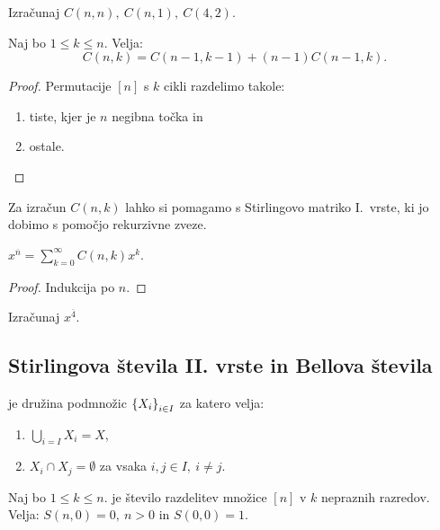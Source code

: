 \begin{primer}
    Izračunaj $C(n,n), \ C(n, 1), \ C(4,2)$.
\end{primer}

\begin{trditev}
    Naj bo $1 \leq k \leq n$. Velja:
    $$C(n, k) = C(n-1, k-1) + (n-1)C(n-1, k).$$
\end{trditev}

\begin{proof}
    Permutacije $[n]$ s $k$ cikli razdelimo takole:
    \begin{enumerate}
        \item tiste, kjer je $n$ negibna točka in
        \item ostale. \qedhere
    \end{enumerate}
\end{proof}

Za izračun $C(n,k)$ lahko si pomagamo s Stirlingovo matriko I.\ vrste, ki jo dobimo s pomočjo rekurzivne zveze.

\begin{trditev}
    $x^{\overline{n}} = \sum_{k=0}^{\infty}C(n,k)x^k$.
\end{trditev}

\begin{proof}
    Indukcija po $n$.
\end{proof}

\begin{primer}
    Izračunaj $x^{\overline{4}}$.
\end{primer}

\subsection{Stirlingova števila II. vrste in Bellova števila}
\begin{definicija}
     je družina podmnožic $\left\{X_i\right\}_{i \in I}$ za katero velja:
    \begin{enumerate}
        \item $\bigcup_{i=I}X_i =X$,
        \item $X_i \cap X_j = \emptyset$ za vsaka $i,j \in I, \ i \neq j$.
    \end{enumerate}
\end{definicija}

\begin{definicija}
    Naj bo $1 \leq k \leq n$.  je število razdelitev množice $[n]$ v $k$ nepraznih razredov. Velja: $S(n, 0) = 0, \ n > 0$ in $S(0,0) = 1$.
\end{definicija}

